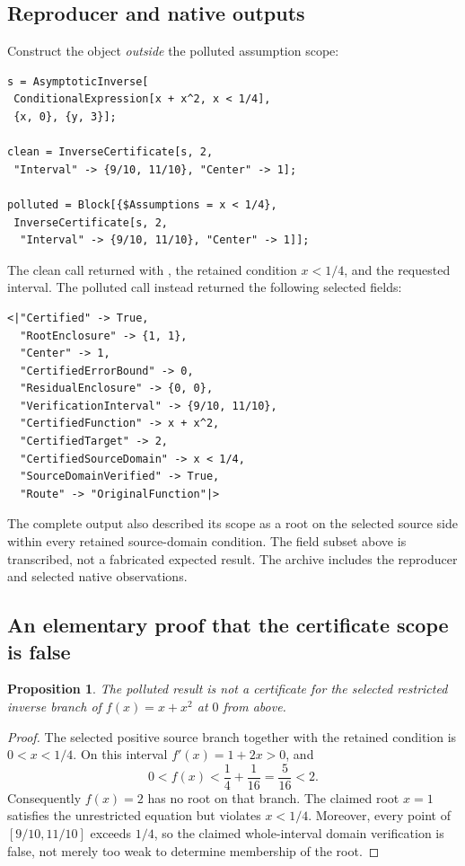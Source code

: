 \documentclass[11pt,a4paper]{article}
\newcommand{\code}[1]{\texttt{\detokenize{#1}}}
\newtheorem{proposition}{Proposition}[section]
\begin{document}
\subsection{Reproducer and native outputs}
Construct the object \emph{outside} the polluted assumption scope:
\begin{lstlisting}
s = AsymptoticInverse[
 ConditionalExpression[x + x^2, x < 1/4],
 {x, 0}, {y, 3}];

clean = InverseCertificate[s, 2,
 "Interval" -> {9/10, 11/10}, "Center" -> 1];

polluted = Block[{$Assumptions = x < 1/4},
 InverseCertificate[s, 2,
  "Interval" -> {9/10, 11/10}, "Center" -> 1]];
\end{lstlisting}
The clean call returned \code{Failure["OutsideBranch",...]} with \code{"Certified" -> False}, the retained condition $x<1/4$, and the requested interval. The polluted call instead returned the following selected fields:
\begin{lstlisting}
<|"Certified" -> True,
  "RootEnclosure" -> {1, 1},
  "Center" -> 1,
  "CertifiedErrorBound" -> 0,
  "ResidualEnclosure" -> {0, 0},
  "VerificationInterval" -> {9/10, 11/10},
  "CertifiedFunction" -> x + x^2,
  "CertifiedTarget" -> 2,
  "CertifiedSourceDomain" -> x < 1/4,
  "SourceDomainVerified" -> True,
  "Route" -> "OriginalFunction"|>
\end{lstlisting}
The complete output also described its scope as a root on the selected source side within every retained source-domain condition. The field subset above is transcribed, not a fabricated expected result. The archive includes the reproducer and selected native observations.

\subsection{An elementary proof that the certificate scope is false}
\begin{proposition}
The polluted result is not a certificate for the selected restricted inverse branch of $f(x)=x+x^2$ at $0$ from above.
\end{proposition}
\begin{proof}
The selected positive source branch together with the retained condition is $0<x<1/4$. On this interval $f'(x)=1+2x>0$, and
\[
 0<f(x)<\frac14+\frac1{16}=\frac5{16}<2.
\]
Consequently $f(x)=2$ has no root on that branch. The claimed root $x=1$ satisfies the unrestricted equation but violates $x<1/4$. Moreover, every point of $[9/10,11/10]$ exceeds $1/4$, so the claimed whole-interval domain verification is false, not merely too weak to determine membership of the root.
\end{proof}
\end{document}
